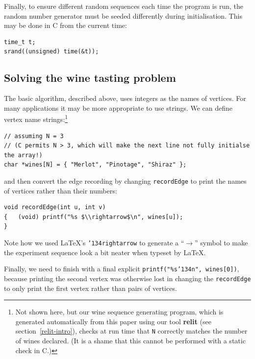 \documentclass[preprint,times]{elsarticle}
\def\name#1{\textbf{#1}}
\begin{document}
Finally, to ensure different random sequences each time the program is run, the random number generator must be seeded differently during initialisation. This may be done in C from the current time:

\begin{Verbatim}
time_t t;
srand((unsigned) time(&t)); 
\end{Verbatim}

\subsection{Solving the wine tasting problem}\label{winetasting}
The basic algorithm, described above, uses integers as the names of vertices. For many applications it may be more appropriate to use strings. We can define vertex name strings:\footnote{Not shown here, but our wine sequence generating program, which is generated automatically from this paper using our tool \name{relit} (see section~\ref{relit-intro}), checks at run time that \texttt{N} correctly matches the number of wines declared. (It is a shame that this cannot be performed with a static check in C.)}

\begin{Verbatim}
// assuming N = 3 
// (C permits N > 3, which will make the next line not fully initialse the array!)
char *wines[N] = { "Merlot", "Pinotage", "Shiraz" }; 
\end{Verbatim}

and then convert the edge recording by changing \texttt{recordEdge} to print the names of vertices rather than their numbers: 

\begin{Verbatim}
void recordEdge(int u, int v) 
{   (void) printf("%s $\\rightarrow$\n", wines[u]);
}
\end{Verbatim}

\label{winelist}
Note how we used \LaTeX's \texttt{\char'134rightarrow} to generate a ``$\rightarrow$'' symbol to make the experiment sequence look a bit neater when typeset by \LaTeX\@. 

Finally, we need to finish with a final explicit \texttt{printf("\%s\char'134n", wines[0])}, because printing the second vertex was otherwise lost in changing the \verb|recordEdge| to only print the first vertex rather than pairs of vertices. 
\end{document}
